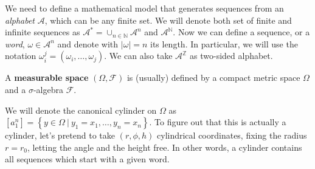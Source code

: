 We need to define a mathematical model that generates sequences from an \emph{alphabet} $\mathcal{A}$, which can be any finite set.
We will denote both set of finite and infinite sequences as $\mathcal{A}^{*} = \cup_{n \in \mathbb{N}} \mathcal{A}^n$ and $\mathcal{A}^\mathbb{N}$.
Now we can define a sequence, or a \emph{word}, $\omega \in \mathcal{A}^n$ and denote with $\left\lvert \omega \right\rvert = n$ its length.
In particular, we will use the notation $\omega_i^j = \left(\omega_i, \ldots, \omega_j\right)$.
We can also take $\mathcal{A}^\mathbb{Z}$ as two-sided alphabet.

\begin{definition}
    A \textbf{measurable space} $\left(\Omega, \mathcal{F}\right)$ is (usually) defined by a compact metric space $\Omega$ and a $\sigma$-algebra $\mathcal{F}$.
\end{definition}

We will denote the canonical cylinder on $\Omega$ as $\left[a_1^n\right] = \left\{y \in \Omega \ \vert \ y_1 = x_1, \ldots, y_n = x_n\right\}$.
To figure out that this is actually a cylinder, let's pretend to take $\left(r, \phi, h\right)$ cylindrical coordinates, fixing the radius $r = r_0$, letting the angle and the height free.
In other words, a cylinder contains all sequences which start with a given word.

